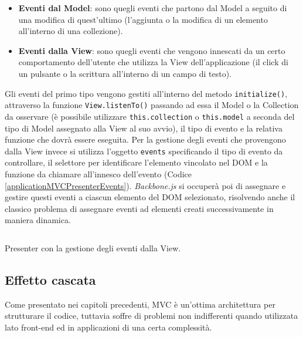 \begin{itemize}
    \item \textbf{Eventi dal Model}: sono quegli eventi che partono dal Model a seguito di una modifica di quest'ultimo (l'aggiunta o la modifica di un elemento all'interno di una collezione).
    \item \textbf{Eventi dalla View}: sono quegli eventi che vengono innescati da un certo comportamento dell'utente che utilizza la View dell'applicazione (il click di un pulsante o la scrittura all'interno di un campo di testo).
\end{itemize}

\noindent
Gli eventi del primo tipo vengono gestiti all'interno del metodo \texttt{initialize()}, attraverso la funzione \texttt{View.listenTo()} passando ad essa il Model o la Collection da osservare (è possibile utilizzare \texttt{this.collection} o \texttt{this.model} a seconda del tipo di Model assegnato alla View al suo avvio), il tipo di evento e la relativa funzione che dovrà essere eseguita.
Per la gestione degli eventi che provengono dalla View invece si utilizza l'oggetto \texttt{events} specificando il tipo di evento da controllare, il selettore per identificare l'elemento vincolato nel DOM e la funzione da chiamare all'innesco dell'evento (Codice \ref{applicationMVCPresenterEvents}). \textit{Backbone.js} si occuperà poi di assegnare e gestire questi eventi a ciascun elemento del DOM selezionato, risolvendo anche il classico problema di assegnare eventi ad elementi creati successivamente in maniera dinamica.

\begin{listing}[ht]
\inputminted{javascript}{sources/applicationMVCPresenterEvents.js}
\caption{Presenter con la gestione degli eventi dalla View.} 
\label{applicationMVCPresenterEvents} 
\end{listing} 

\subsection{Effetto cascata}
Come presentato nei capitoli precedenti, MVC è un'ottima architettura per strutturare il codice, tuttavia soffre di problemi non indifferenti quando utilizzata lato front-end ed in applicazioni di una certa complessità.


